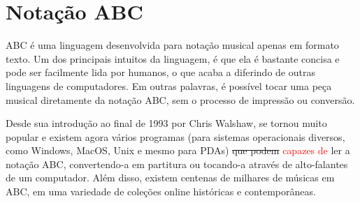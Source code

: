 \documentclass{automatextcc}
\newcommand{\pumi}[1]{\textcolor{red}{#1}}
\begin{document}





\section{Notação ABC}

ABC é uma linguagem desenvolvida para notação musical apenas em formato texto. Um dos principais intuitos da linguagem, é que ela é bastante concisa e pode ser facilmente lida por humanos,  o que acaba a diferindo de outras linguagens de computadores. Em outras palavras, é possível tocar uma peça musical diretamente da notação ABC, sem o processo de impressão ou conversão. 

Desde sua introdução ao final de 1993 por Chris Walshaw, se tornou muito popular e existem agora vários programas (para sistemas operacionais diversos, como Windows, MacOS, Unix e mesmo para PDAs) \sout{que podem} \pumi{capazes de} ler a notação ABC, convertendo-a em partitura ou tocando-a através de alto-falantes de um computador. Além disso, existem centenas de milhares de músicas em ABC, em uma variedade de coleções online históricas e contemporâneas.


\end{document}
